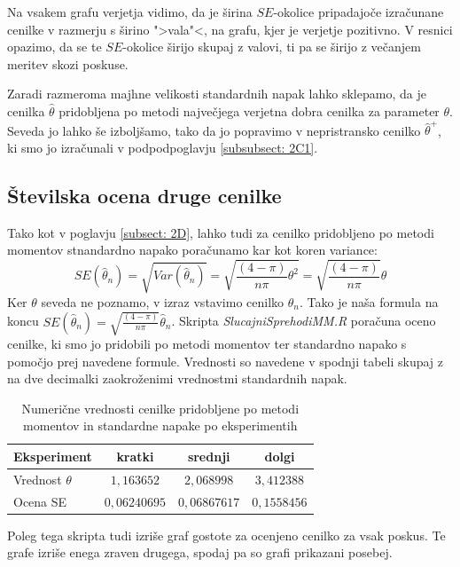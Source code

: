 \documentclass[a4paper, 10pt]{article}
\begin{document}
	Na vsakem grafu verjetja vidimo, da je širina $SE$-okolice pripadajoče izračunane cenilke v razmerju s širino ">vala"<, na grafu, kjer je verjetje pozitivno. V resnici opazimo, da se te $SE$-okolice širijo skupaj z valovi, ti pa se širijo z večanjem meritev skozi poskuse. 
	
	Zaradi razmeroma majhne velikosti standardnih napak lahko sklepamo, da je cenilka $\widehat{\theta}$ pridobljena po metodi največjega verjetna dobra cenilka za parameter $\theta$. Seveda jo lahko še izboljšamo, tako da jo popravimo v nepristransko cenilko $\widehat{\theta}^{+}$, ki smo jo izračunali v podpodpoglavju \ref{subsubsect: 2C1}.
	
	\subsection{Številska ocena druge cenilke} \label{subsect: 2E}
	
	Tako kot v poglavju \ref{subsect: 2D}, lahko tudi za cenilko pridobljeno po metodi momentov stnandardno napako poračunamo kar kot koren variance: $$SE(\widehat{\theta}_n) = \sqrt{Var(\widehat{\theta}_n)} = \sqrt{\frac{(4-\pi)}{n\pi}\theta^2} = \sqrt{\frac{(4-\pi)}{n\pi}}\theta$$ Ker $\theta$ seveda ne poznamo, v izraz vstavimo cenilko $\widehat{\theta}_n$. Tako je naša formula na koncu $SE(\widehat{\theta}_n) = \sqrt{\frac{(4-\pi)}{n\pi}}\widehat{\theta}_n$. 
	Skripta \textit{SlucajniSprehodiMM.R} poračuna oceno cenilke, ki smo jo pridobili po metodi momentov ter standardno napako s pomočjo prej navedene formule. Vrednosti so navedene v spodnji tabeli skupaj z na dve decimalki zaokroženimi vrednostmi standardnih napak.
	
	\begin{table}[h!]
		\label{tab: mmse}
		\centering
		\begin{tabular}{|l|c|c|c|}
			\hline
			Eksperiment & kratki & srednji & dolgi \\ \hline
			Vrednost $\theta$ & $1{,}163652$ & $2{,}068998$ & $3{,}412388$ \\ \hline
			Ocena SE & $0{,}06240695$ & $0{,}06867617$ & $0{,}1558456$ \\ \hline
		\end{tabular}
		\caption{Numerične vrednosti cenilke pridobljene po metodi momentov in standardne napake po eksperimentih}
	\end{table}

	Poleg tega skripta tudi izriše graf gostote za ocenjeno cenilko za vsak poskus. Te grafe izriše enega zraven drugega, spodaj pa so grafi prikazani posebej.
	
\end{document}
